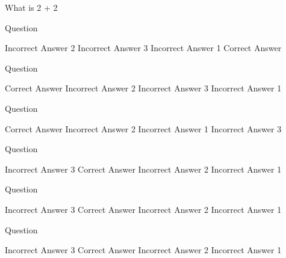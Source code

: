 \begin{questions}
\question
What is 2 + 2
\begin{choices}
\end{choices}
\question
Question
\begin{choices}
\choice Incorrect Answer 2
\choice Incorrect Answer 3
\choice Incorrect Answer 1
\CorrectChoice Correct Answer
\end{choices}
\question
Question
\begin{choices}
\CorrectChoice Correct Answer
\choice Incorrect Answer 2
\choice Incorrect Answer 3
\choice Incorrect Answer 1
\end{choices}
\question
Question
\begin{choices}
\CorrectChoice Correct Answer
\choice Incorrect Answer 2
\choice Incorrect Answer 1
\choice Incorrect Answer 3
\end{choices}
\question
Question
\begin{choices}
\choice Incorrect Answer 3
\CorrectChoice Correct Answer
\choice Incorrect Answer 2
\choice Incorrect Answer 1
\end{choices}
\question
Question
\begin{choices}
\choice Incorrect Answer 3
\CorrectChoice Correct Answer
\choice Incorrect Answer 2
\choice Incorrect Answer 1
\end{choices}
\question
Question
\begin{choices}
\choice Incorrect Answer 3
\CorrectChoice Correct Answer
\choice Incorrect Answer 2
\choice Incorrect Answer 1
\end{choices}
\end{questions}
